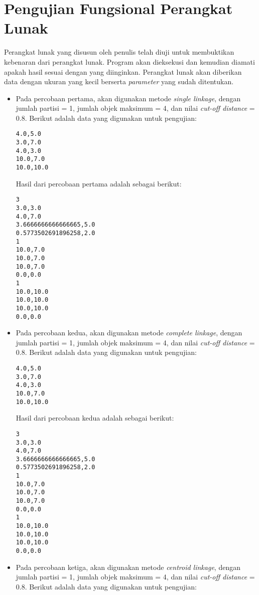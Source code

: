 \section{Pengujian Fungsional Perangkat Lunak}

Perangkat lunak yang disusun oleh penulis telah diuji untuk membuktikan kebenaran dari perangkat lunak. Program akan dieksekusi dan kemudian diamati apakah hasil sesuai dengan yang diinginkan. Perangkat lunak akan diberikan data dengan ukuran yang kecil berserta \textit{parameter} yang sudah ditentukan. 

\begin{itemize}

\item Pada percobaan pertama, akan digunakan metode \textit{single linkage}, dengan jumlah partisi = 1, jumlah objek maksimum = 4, dan nilai \textit{cut-off distance} = 0.8. Berikut adalah data yang digunakan untuk pengujian:

\begin{verbatim}
4.0,5.0
3.0,7.0
4.0,3.0
10.0,7.0
10.0,10.0
\end{verbatim}

Hasil dari percobaan pertama adalah sebagai berikut:

\begin{verbatim}
3
3.0,3.0
4.0,7.0
3.6666666666666665,5.0
0.5773502691896258,2.0
1
10.0,7.0
10.0,7.0
10.0,7.0
0.0,0.0
1
10.0,10.0
10.0,10.0
10.0,10.0
0.0,0.0
\end{verbatim}

\item Pada percobaan kedua, akan digunakan metode \textit{complete linkage}, dengan jumlah partisi = 1, jumlah objek maksimum = 4, dan nilai \textit{cut-off distance} = 0.8. Berikut adalah data yang digunakan untuk pengujian:

\begin{verbatim}
4.0,5.0
3.0,7.0
4.0,3.0
10.0,7.0
10.0,10.0
\end{verbatim}

Hasil dari percobaan kedua adalah sebagai berikut:

\begin{verbatim}
3
3.0,3.0
4.0,7.0
3.6666666666666665,5.0
0.5773502691896258,2.0
1
10.0,7.0
10.0,7.0
10.0,7.0
0.0,0.0
1
10.0,10.0
10.0,10.0
10.0,10.0
0.0,0.0
\end{verbatim}

\item Pada percobaan ketiga, akan digunakan metode \textit{centroid linkage}, dengan jumlah partisi = 1, jumlah objek maksimum = 4, dan nilai \textit{cut-off distance} = 0.8. Berikut adalah data yang digunakan untuk pengujian:


\end{itemize}
